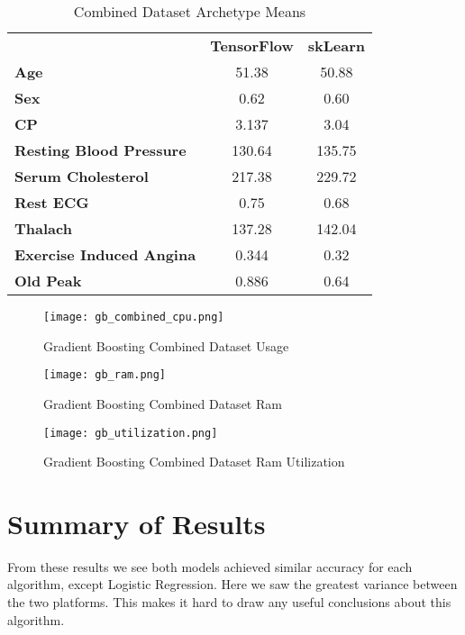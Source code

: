 \documentclass[conference]{IEEEtran}
\begin{document}
\FloatBarrier
\begin{table}[!htbp]
\caption{Combined Dataset Archetype Means}
\begin{center}
\begin{tabular}{|l|c|c|}
\hline
\textbf{ }&\textbf{TensorFlow}&\textbf{skLearn} \\
\cline{1-3} 
\textbf{Age} & 51.38 & 50.88 \\
\cline{1-3} 
\textbf{Sex} & 0.62 & 0.60 \\
\cline{1-3} 
\textbf{CP} & 3.137 & 3.04 \\
\cline{1-3} 
\textbf{Resting Blood Pressure} & 130.64 & 135.75 \\
\cline{1-3} 
\textbf{Serum Cholesterol} & 217.38 & 229.72 \\
\cline{1-3} 
\textbf{Rest ECG} & 0.75 & 0.68 \\
\cline{1-3} 
\textbf{Thalach} & 137.28 & 142.04 \\
\cline{1-3} 
\textbf{Exercise Induced Angina} & 0.344 & 0.32 \\
\cline{1-3} 
\textbf{Old Peak} & 0.886 & 0.64 \\
\cline{1-3} 
\hline
\end{tabular}
\label{tab15}
\end{center}
\end{table}
\FloatBarrier


\begin{figure}[!htbp]
    \centering
    \texttt{[image: gb\_combined\_cpu.png]}
    \caption{Gradient Boosting Combined Dataset Usage}
\end{figure}


\begin{figure}[!htbp]
    \centering
    \texttt{[image: gb\_ram.png]}
    \caption{Gradient Boosting Combined Dataset Ram}
\end{figure}


\begin{figure}[!htbp]
    \centering
    \texttt{[image: gb\_utilization.png]}
    \caption{Gradient Boosting Combined Dataset Ram Utilization}
\end{figure}
\FloatBarrier



\section{Summary of Results}
From these results we see both models achieved similar accuracy for each algorithm, except Logistic Regression. Here we saw the greatest variance between the two platforms. This makes it hard to draw any useful conclusions about this algorithm. 
\end{document}
